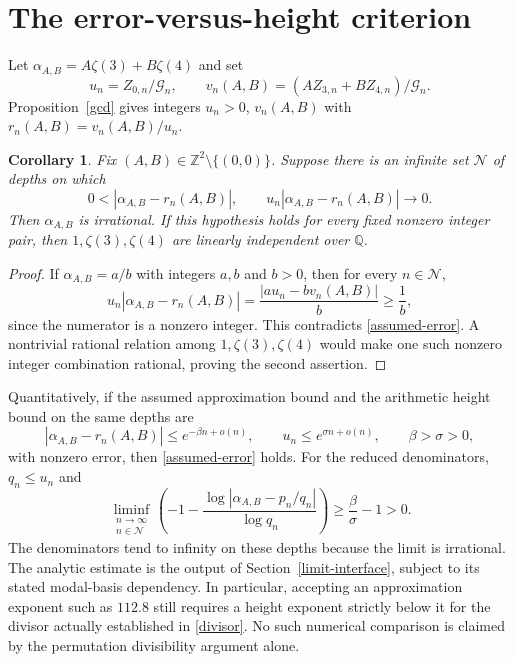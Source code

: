 \documentclass[11pt]{article}
\newcommand{\Z}{\mathbb Z}
\newtheorem{corollary}[proposition]{Corollary}
\begin{document}
\section{The error-versus-height criterion}
Let $\alpha_{A,B}=A\zeta(3)+B\zeta(4)$ and set
\[
 u_n=Z_{0,n}/\mathcal G_n,\qquad
 v_n(A,B)=(AZ_{3,n}+BZ_{4,n})/\mathcal G_n.
\]
Proposition~\ref{gcd} gives integers $u_n>0$, $v_n(A,B)$ with
$r_n(A,B)=v_n(A,B)/u_n$.

\begin{corollary}
Fix $(A,B)\in\Z^2\setminus\{(0,0)\}$. Suppose there is an infinite
set $\mathcal N$ of depths on which
\begin{equation}\label{assumed-error}
 0<|\alpha_{A,B}-r_n(A,B)|,\qquad
 u_n|\alpha_{A,B}-r_n(A,B)|\longrightarrow0.
\end{equation}
Then $\alpha_{A,B}$ is irrational. If this hypothesis holds for every
fixed nonzero integer pair, then $1,\zeta(3),\zeta(4)$ are linearly
independent over $\mathbb Q$.
\end{corollary}
\begin{proof}
If $\alpha_{A,B}=a/b$ with integers $a,b$ and $b>0$, then for every
$n\in\mathcal N$,
\[
 u_n|\alpha_{A,B}-r_n(A,B)|
 =\frac{|au_n-bv_n(A,B)|}{b}\geq\frac1b,
\]
since the numerator is a nonzero integer. This contradicts
\eqref{assumed-error}. A nontrivial rational relation among
$1,\zeta(3),\zeta(4)$ would make one such nonzero integer combination
rational, proving the second assertion.
\end{proof}

Quantitatively, if the assumed approximation bound and the arithmetic
height bound on the same depths are
\[
 |\alpha_{A,B}-r_n(A,B)|\leq e^{-\beta n+o(n)},\qquad
 u_n\leq e^{\sigma n+o(n)},\qquad \beta>\sigma>0,
\]
with nonzero error, then \eqref{assumed-error} holds. For the reduced
denominators, $q_n\leq u_n$ and
\[
 \liminf_{\substack{n\to\infty\\n\in\mathcal N}}
 \left(-1-\frac{\log|\alpha_{A,B}-p_n/q_n|}{\log q_n}\right)
 \geq\frac{\beta}{\sigma}-1>0.
\]
The denominators tend to infinity on these depths because the limit
is irrational. The analytic estimate is the output of Section~\ref{limit-interface}, subject to its stated modal-basis dependency. In particular,
accepting an approximation exponent such as $112.8$ still requires a
height exponent strictly below it for the divisor actually established
in \eqref{divisor}. No such numerical comparison is claimed by the
permutation divisibility argument alone.
\end{document}
